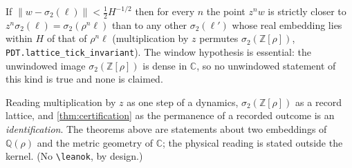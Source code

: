 \begin{theorem}
  \label{thm:certification}
  \leanok
  If $\|w - \sigma_2(\ell)\| < \tfrac12 H^{-1/2}$ then for every $n$ the point $z^n w$ is
  strictly closer to $z^n\sigma_2(\ell) = \sigma_2(\rho^n\ell)$ than to any other
  $\sigma_2(\ell')$ whose real embedding lies within $H$ of that of $\rho^n\ell$
  (multiplication by $z$ permutes $\sigma_2(\mathbb{Z}[\rho])$,
  \lstinline{PDT.lattice_tick_invariant}). The window hypothesis is essential: the
  unwindowed image $\sigma_2(\mathbb{Z}[\rho])$ is dense in $\mathbb{C}$, so no unwindowed
  statement of this kind is true and none is claimed.
\end{theorem}

\begin{assumption}
  \label{ass:record}
  Reading multiplication by $z$ as one step of a dynamics, $\sigma_2(\mathbb{Z}[\rho])$ as a
  record lattice, and \cref{thm:certification} as the permanence of a recorded outcome is an
  \emph{identification}. The theorems above are statements about two embeddings of
  $\mathbb{Q}(\rho)$ and the metric geometry of $\mathbb{C}$; the physical reading is stated
  outside the kernel. (No \texttt{\textbackslash leanok}, by design.)
\end{assumption}
